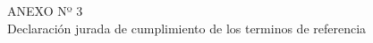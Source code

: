 \begin{center}
    \vspace*{\fill} %
    \Huge %
    ANEXO Nº 3 \\
    Declaración jurada de cumplimiento de los terminos de referencia
    \vspace*{\fill} %
\end{center}